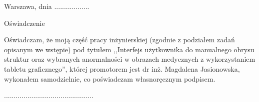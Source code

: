 \documentclass[a4paper,11pt,twoside,openright]{report}
\theoremstyle{definition}
\newcommand{\tytul}{Interfejs użytkownika do manualnego obrysu struktur oraz wybranych anormalności w obrazach medycznych z wykorzystaniem tabletu graficznego}
\renewcommand{\title}{User interface for graphic-tablet interactions for contouring of structures and selected anormalies in medical images}
\newcommand{\type}{inżyniers} %
\newcommand{\supervisor}{dr inż. Magdalena Jasionowska}
\begin{document}
{
\begin{abstract}

The following document describes bachelor's thesis on "\title". The goal of authors' is to create a digital tool that allows to manually draw and semi-automatically generate contours on medical images. The topics discussed include: discussion of DICOM standard, analysis of state-of-the-art systems and tools used to viewing and creating contours on DICOM medical images, system's architectue and experiments conducted simultaneously with the creation of the tool.

The architecture used enables simultaneous use of the tool by many users. The algorithm developed for te purpose of generating contourse uses Canny's Operator and the algorithm of searching the shortest path in the graph. The statistics calculated by the system regarding the areas limited by contourcan be used in future as input parameters for methods of automatic detection of similar structures for which contours have been made.
\\
\\
\noindent \textbf{Keywords:} user interface, graphics tablet, medical images, DICOM, contour, statistics of image data, IT system, REST API interface, edge detection, contour generation
\end{abstract}
}




\null\thispagestyle{empty}\newpage

\null \hfill Warszawa, dnia ..................\\

\par\vspace{5cm}

\begin{center}
Oświadczenie
\end{center}

\indent Oświadczam, że moją część pracy \type kiej
(zgodnie z podziałem zadań opisanym we wstępie) pod
tytułem ,,\tytul '', której promotorem jest \supervisor , wykonałem
samodzielnie, co poświadczam własnoręcznym podpisem.
\vspace{2cm}


\begin{flushright}
  \begin{minipage}{50mm}
    \begin{center}
      ..............................................

    \end{center}
  \end{minipage}
\end{flushright}
\end{document}
